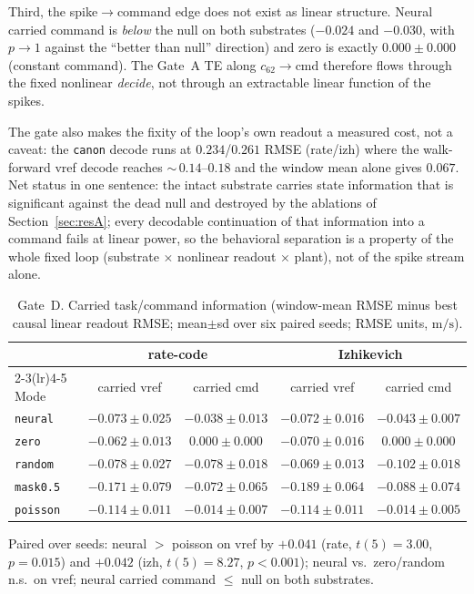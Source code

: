 Third, the spike$\rightarrow$command edge does not exist as linear structure.
Neural carried command is \emph{below} the null on both substrates ($-0.024$
and $-0.030$, with $p\rightarrow 1$ against the ``better than null'' direction)
and zero is exactly $0.000\pm0.000$ (constant command). The Gate~A TE along
$c_{62}\rightarrow\mathrm{cmd}$ therefore flows through the fixed nonlinear
\emph{decide}, not through an extractable linear function of the spikes.

The gate also makes the fixity of the loop's own readout a measured cost, not a
caveat: the \texttt{canon} decode runs at $0.234$/$0.261$ RMSE (rate/izh) where
the walk-forward vref decode reaches $\sim$\,$0.14$--$0.18$ and the window mean
alone gives $0.067$. Net status in one sentence: the intact substrate carries
state information that is significant against the dead null and destroyed by
the ablations of Section~\ref{sec:resA}; every decodable continuation of that
information into a command fails at linear power, so the behavioral separation
is a property of the whole fixed loop (substrate $\times$ nonlinear readout
$\times$ plant), not of the spike stream alone.

\begin{table}[t]
\centering
\caption{Gate~D. Carried task/command information (window-mean RMSE minus best
causal linear readout RMSE; mean$\pm$sd over six paired seeds; RMSE units,
$\mathrm{m/s}$).}
\label{tab:gated}
\footnotesize
\setlength{\tabcolsep}{1pt}
\begin{tabular}{lcc|cc}
\toprule
 & \multicolumn{2}{c|}{\textbf{rate-code}} &
   \multicolumn{2}{c}{\textbf{Izhikevich}}\\
\cmidrule(lr){2-3}\cmidrule(lr){4-5}
Mode & carried vref & carried cmd & carried vref & carried cmd\\
\midrule
\texttt{neural}  & $-0.073\pm0.025$ & $-0.038\pm0.013$ &
                   $-0.072\pm0.016$ & $-0.043\pm0.007$\\
\texttt{zero}    & $-0.062\pm0.013$ & $0.000\pm0.000$ &
                   $-0.070\pm0.016$ & $0.000\pm0.000$\\
\texttt{random}  & $-0.078\pm0.027$ & $-0.078\pm0.018$ &
                   $-0.069\pm0.013$ & $-0.102\pm0.018$\\
\texttt{mask0.5} & $-0.171\pm0.079$ & $-0.072\pm0.065$ &
                   $-0.189\pm0.064$ & $-0.088\pm0.074$\\
\texttt{poisson} & $-0.114\pm0.011$ & $-0.014\pm0.007$ &
                   $-0.114\pm0.011$ & $-0.014\pm0.005$\\
\bottomrule
\end{tabular}
\vspace{2pt}
\begin{flushleft}
\footnotesize
Paired over seeds: neural $>$ poisson on vref by $+0.041$ (rate, $t(5)=3.00$,
$p=0.015$) and $+0.042$ (izh, $t(5)=8.27$, $p<0.001$); neural vs.\ zero/random
n.s.\ on vref; neural carried command $\leq$ null on both substrates.
\end{flushleft}
\end{table}

